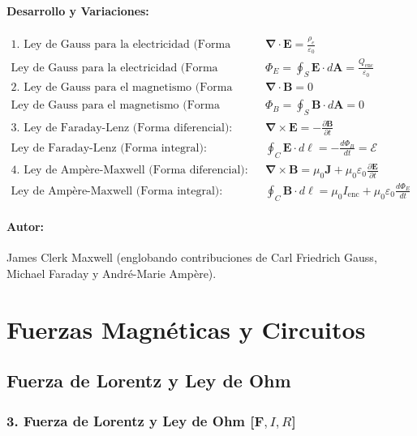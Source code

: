\documentclass[12pt,a4paper]{article}
\begin{document}
\paragraph*{Desarrollo y Variaciones:}
\begin{align*}
\text{1. Ley de Gauss para la electricidad (Forma diferencial):} \quad & \boldsymbol{\nabla} \cdot \mathbf{E} = \frac{\rho_e}{\varepsilon_0} \\
\text{Ley de Gauss para la electricidad (Forma integral):} \quad & \Phi_E = \oint_S \mathbf{E} \cdot d\mathbf{A} = \frac{Q_{\text{enc}}}{\varepsilon_0} \\[6pt]
\text{2. Ley de Gauss para el magnetismo (Forma diferencial):} \quad & \boldsymbol{\nabla} \cdot \mathbf{B} = 0 \\
\text{Ley de Gauss para el magnetismo (Forma integral):} \quad & \Phi_B = \oint_S \mathbf{B} \cdot d\mathbf{A} = 0 \\[6pt]
\text{3. Ley de Faraday-Lenz (Forma diferencial):} \quad & \boldsymbol{\nabla} \times \mathbf{E} = -\frac{\partial \mathbf{B}}{\partial t} \\
\text{Ley de Faraday-Lenz (Forma integral):} \quad & \oint_C \mathbf{E} \cdot d\mathbf{\ell} = -\frac{d\Phi_B}{dt} = \mathcal{E} \\[6pt]
\text{4. Ley de Ampère-Maxwell (Forma diferencial):} \quad & \boldsymbol{\nabla} \times \mathbf{B} = \mu_0 \mathbf{J} + \mu_0 \varepsilon_0 \frac{\partial \mathbf{E}}{\partial t} \\
\text{Ley de Ampère-Maxwell (Forma integral):} \quad & \oint_C \mathbf{B} \cdot d\mathbf{\ell} = \mu_0 I_{\text{enc}} + \mu_0 \varepsilon_0 \frac{d\Phi_E}{dt}
\end{align*}
\paragraph*{Autor:} James Clerk Maxwell (englobando contribuciones de Carl Friedrich Gauss, Michael Faraday y André-Marie Ampère).

\section{Fuerzas Magnéticas y Circuitos}

\subsection{Fuerza de Lorentz y Ley de Ohm}

\subsubsection*{3. Fuerza de Lorentz y Ley de Ohm [$\mathbf{F}, I, R$]}
\end{document}
